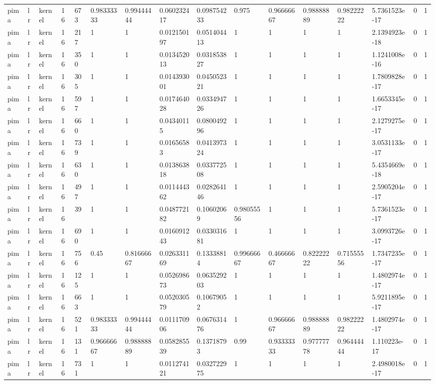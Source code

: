\begin{tabular}{llllllllllllllll}
pima & lr & kernel & 16 & 673 & 0.98333333 & 0.99444444 & 0.060232417 & 0.098754233 & 0.975 & 0.96666667 & 0.98888889 & 0.98222222 & 5.7361523e-17 & 0 & 1 \\
pima & lr & kernel & 16 & 217 & 1 & 1 & 0.012150197 & 0.051404413 & 1 & 1 & 1 & 1 & 2.1394923e-18 & 0 & 1 \\
pima & lr & kernel & 16 & 350 & 1 & 1 & 0.013452013 & 0.031853827 & 1 & 1 & 1 & 1 & 1.1241008e-16 & 0 & 1 \\
pima & lr & kernel & 16 & 305 & 1 & 1 & 0.014393001 & 0.045052321 & 1 & 1 & 1 & 1 & 1.7809828e-17 & 0 & 1 \\
pima & lr & kernel & 16 & 597 & 1 & 1 & 0.017464028 & 0.033494726 & 1 & 1 & 1 & 1 & 1.6653345e-17 & 0 & 1 \\
pima & lr & kernel & 16 & 660 & 1 & 1 & 0.04340115 & 0.080049296 & 1 & 1 & 1 & 1 & 2.1279275e-17 & 0 & 1 \\
pima & lr & kernel & 16 & 739 & 1 & 1 & 0.01656583 & 0.041397324 & 1 & 1 & 1 & 1 & 3.0531133e-17 & 0 & 1 \\
pima & lr & kernel & 16 & 630 & 1 & 1 & 0.013863818 & 0.033772508 & 1 & 1 & 1 & 1 & 5.4354669e-18 & 0 & 1 \\
pima & lr & kernel & 16 & 497 & 1 & 1 & 0.011444362 & 0.028264146 & 1 & 1 & 1 & 1 & 2.5905204e-17 & 0 & 1 \\
pima & lr & kernel & 16 & 39 & 1 & 1 & 0.048772182 & 0.10602069 & 0.98055556 & 1 & 1 & 1 & 5.7361523e-17 & 0 & 1 \\
pima & lr & kernel & 16 & 690 & 1 & 1 & 0.016091243 & 0.033031681 & 1 & 1 & 1 & 1 & 3.0993726e-17 & 0 & 1 \\
pima & lr & kernel & 16 & 756 & 0.45 & 0.81666667 & 0.026331169 & 0.13338814 & 0.99666667 & 0.46666667 & 0.82222222 & 0.71555556 & 1.7347235e-17 & 0 & 1 \\
pima & lr & kernel & 16 & 125 & 1 & 1 & 0.052698673 & 0.063529203 & 1 & 1 & 1 & 1 & 1.4802974e-17 & 0 & 1 \\
pima & lr & kernel & 16 & 663 & 1 & 1 & 0.052030579 & 0.10679052 & 1 & 1 & 1 & 1 & 5.9211895e-17 & 0 & 1 \\
pima & lr & kernel & 16 & 521 & 0.98333333 & 0.99444444 & 0.011170906 & 0.067631476 & 1 & 0.96666667 & 0.98888889 & 0.98222222 & 1.4802974e-17 & 0 & 1 \\
pima & lr & kernel & 16 & 131 & 0.96666667 & 0.98888889 & 0.058285539 & 0.13718793 & 0.99 & 0.93333333 & 0.97777778 & 0.96444444 & 1.110223e-17 & 0 & 1 \\
pima & lr & kernel & 16 & 731 & 1 & 1 & 0.011274121 & 0.032722975 & 1 & 1 & 1 & 1 & 2.4980018e-17 & 0 & 1 \\

\end{tabular}
